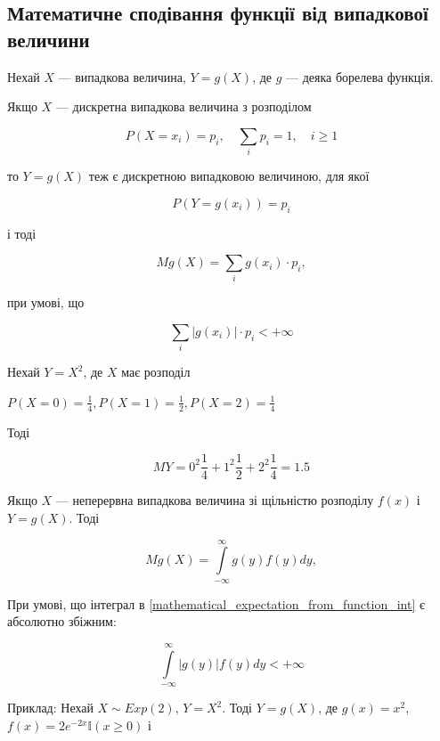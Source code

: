 \subsection{Математичне сподівання функції від випадкової величини}

Нехай $X$ --- випадкова величина, $Y = g(X)$, де $g$ --- деяка
борелева функція.

Якщо $X$ --- дискретна випадкова величина з розподілом 

$$P(X=x_i) = p_i,
\quad \sum\limits_{i} p_i = 1,
\quad i \geqslant 1$$

то $Y = g(X)$ теж є дискретною випадковою
величиною, для якої 

$$P(Y=g(x_i)) = p_i$$

і тоді 

\begin{equation}
    Mg(X) = \sum\limits_{i} g(x_i) \cdot p_i,
\end{equation}

при умові, що

$$\sum\limits_{i} |g(x_i)| \cdot p_i < +\infty$$

\begin{example}
    Нехай $Y = X^2$, де $X$ має розподіл 
    
    $P(X=0) = \frac{1}{4}, P(X=1) = \frac{1}{2}, P(X=2) = \frac{1}{4}$
    
    Тоді 
    
    $$MY = 0^2 \frac{1}{4} + 1^2 \frac{1}{2} + 2^2 \frac{1}{4} = 1.5$$
    
    Якщо $X$ --- неперервна випадкова величина зі
    щільністю розподілу $f(x)$ і $Y = g(X)$. Тоді
    
    \begin{equation}
        \label{mathematical_expectation_from_function_int}
        Mg(X) = \int\limits_{-\infty}^{\infty} g(y) f(y) dy,
    \end{equation}
    
    При умові, що інтеграл в \ref{mathematical_expectation_from_function_int}
    є абсолютно збіжним: 
    
    $$\int\limits_{-\infty}^{\infty} |g(y)| f(y) dy < +\infty$$
\end{example}

\begin{example}
\end{example}
Приклад: Нехай $X \sim Exp(2)$, $Y = X^2$.
Тоді $Y = g(X)$, де $g(x) = x^2$, $f(x) = 2e^{-2x} \mathbb{I}(x \geqslant 0)$
і 

